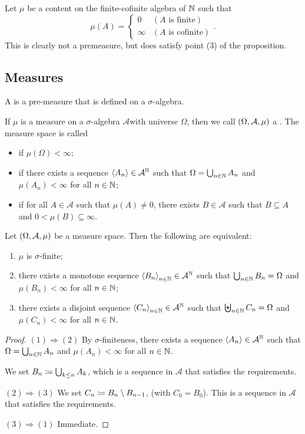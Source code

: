 \begin{example}
Let $\mu$ be a content on the finite-cofinite algebra of $\mathbb{N}$ such that
\[ \mu(A) = \begin{cases}
0 & (\text{$A$ is finite}) \\ \infty & (\text{$A$ is cofinite})
\end{cases}. \]
This is clearly not a premeasure, but does satisfy point (3) of the proposition.
\end{example}

\subsection{Measures}
\begin{definition}
A  is a pre-measure that is defined on a $\sigma$-algebra.

If $\mu$ is a measure on a $\sigma$-algebra $\mathcal{A}$with universe $\Omega$, then we call $\sSet{\Omega, \mathcal{A}, \mu}$ a . The measure space is called
\begin{itemize}
\item {} if $\mu(\Omega) < \infty$;
\item {} if there exists a sequence $\left\langle A_n \right\rangle\in \mathcal{A}^{\mathbb{N}}$ such that $\Omega = \bigcup_{n\in\mathbb{N}}A_n$ and $\mu(A_n)<\infty$ for all $n\in\mathbb{N}$;
\item {} if for all $A\in \mathcal{A}$ such that $\mu(A) \neq 0$, there exists $B\in \mathcal{A}$ such that $B\subseteq A$ and $0< \mu(B) \subseteq \infty$.
\end{itemize}
\end{definition}

\begin{lemma} \label{sigmaFiniteSequences}
Let $\sSet{\Omega, \mathcal{A}, \mu}$ be a measure space. Then the following are equivalent:
\begin{enumerate}
\item $\mu$ is $\sigma$-finite;
\item there exists a monotone sequence $\left\langle B_n \right\rangle_{n\in \mathbb{N}}\in\mathcal{A}^{\mathbb{N}}$ such that $\bigcup_{n\in\mathbb{N}}B_n = \Omega$ and $\mu(B_n) < \infty$ for all $n\in\mathbb{N}$;
\item there exists a disjoint sequence $\left\langle C_n \right\rangle_{n\in \mathbb{N}}\in\mathcal{A}^{\mathbb{N}}$ such that $\biguplus_{n\in\mathbb{N}}C_n = \Omega$ and $\mu(C_n) < \infty$ for all $n\in\mathbb{N}$.
\end{enumerate}
\end{lemma}
\begin{proof}
$(1) \Rightarrow (2)$ By $\sigma$-finiteness, there exists a sequence $\left\langle A_n \right\rangle\in \mathcal{A}^{\mathbb{N}}$ such that $\Omega = \bigcup_{n\in\mathbb{N}}A_n$ and $\mu(A_n)<\infty$ for all $n\in\mathbb{N}$.

We set $B_n \coloneqq \bigcup_{k\leq n} A_k$, which is a sequence in $\mathcal{A}$ that satisfies the requirements.

$(2) \Rightarrow (3)$ We set $C_n \coloneqq B_n\setminus B_{n-1}$, (with $C_0 = B_0$). This is a sequence in $\mathcal{A}$ that satisfies the requirements.

$(3) \Rightarrow (1)$ Immediate.
\end{proof}

